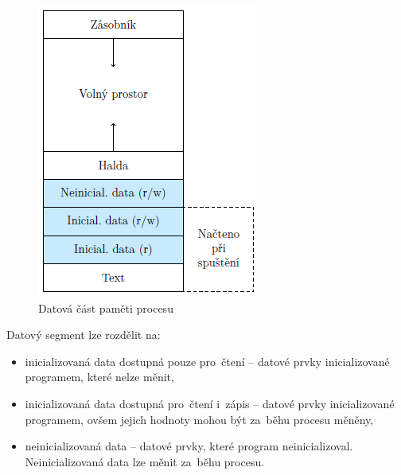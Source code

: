 \begin{figure}[ht]
\begin{minipage}[b]{0.47\textwidth}
		\includegraphics[width=\textwidth]{images/proc_data_segment.png}
		\caption{Datová část paměti procesu}
		\label{proc_data_segment}
	\end{minipage}
\end{figure}

Datový segment lze rozdělit na:

\begin{itemize}
	\item inicializovaná data dostupná pouze pro~čtení -- datové prvky inicializované programem,
	které nelze měnit,
	\item inicializovaná data dostupná pro~čtení i~zápis -- datové prvky inicializované programem,
	ovšem jejich hodnoty mohou být za~běhu procesu měněny,
	\item neinicializovaná data -- datové prvky, které program neinicializoval. Neinicializovaná data lze měnit za~běhu procesu.
\end{itemize}

